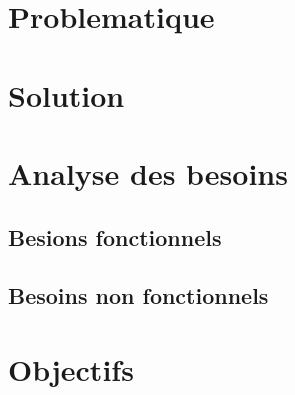 \section{Problematique}
\lipsum[2-2]
\section{Solution}
\lipsum[2-2]
\section{Analyse des besoins}
\lipsum[2-2]
\subsection{Besions fonctionnels}
\lipsum[2-2]
\subsection{Besoins non fonctionnels}
\lipsum[2-2]
\section{Objectifs}
\lipsum[2-2]